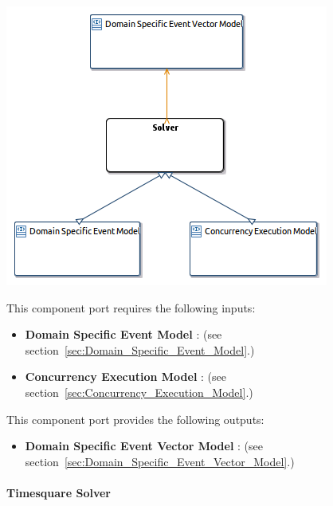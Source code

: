 \documentclass{gemoc} %
\begin{document}
\begin{center}
\includegraphics*[trim=0.0cm 0.0cm 0cm 0.0cm, clip=true]{../images/generated/Generated_Solver.png}
\end{center}

This component port requires the following inputs:
\begin{itemize}
  \item \textbf{Domain Specific Event Model} :
(see section~\ref{sec:Domain_Specific_Event_Model}.)
  \item \textbf{Concurrency Execution Model} :
(see section~\ref{sec:Concurrency_Execution_Model}.)
\end{itemize}

This component port provides the following outputs:
\begin{itemize}
  \item \textbf{Domain Specific Event Vector Model} :
(see section~\ref{sec:Domain_Specific_Event_Vector_Model}.)
\end{itemize}

\paragraph{Timesquare Solver}
\label{sec:Timesquare_Solver}
\end{document}
